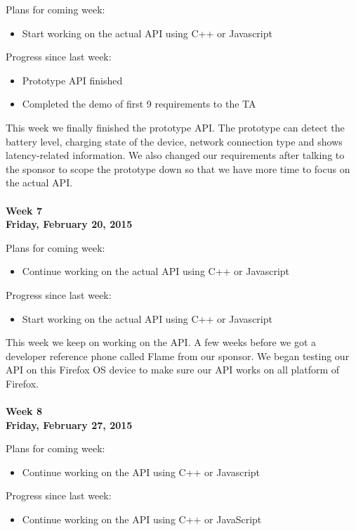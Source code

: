 \noindent Plans for coming week:
\begin{itemize}
\item Start working on the actual API using C++ or Javascript
\end{itemize}

\noindent Progress since last week:
\begin{itemize}
\item Prototype API finished
\item Completed the demo of first 9 requirements to the TA
\end{itemize}

\noindent This week we finally finished the prototype API. The prototype can detect the battery level, charging state of the device, network connection type and shows latency-related information. We also changed our requirements after talking to the sponsor to scope the prototype down so that we have more time to focus on the actual API. \\
\\
\textbf{Week 7\\Friday, February 20, 2015\\}

\noindent Plans for coming week:
\begin{itemize}
\item Continue working on the actual API using C++ or Javascript
\end{itemize}

\noindent Progress since last week:
\begin{itemize}
\item Start working on the actual API using C++ or Javascript
\end{itemize}

\noindent This week we keep on working on the API. A few weeks before we got a developer reference phone called Flame from our sponsor. We began testing our API on this Firefox OS device to make sure our API works on all platform of Firefox. \\
\\
\textbf{Week 8\\Friday, February 27, 2015\\}

\noindent Plans for coming week:
\begin{itemize}
\item Continue working on the API using C++ or Javascript
\end{itemize}

\noindent Progress since last week:
\begin{itemize}
\item Continue working on the API using C++ or JavaScript
\end{itemize}

